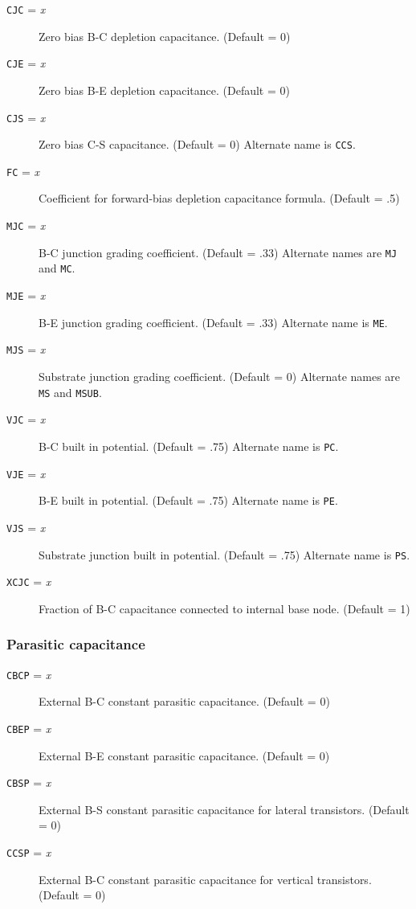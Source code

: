 \begin{description}

\item[{\tt CJC} = {\it x}]
Zero bias B-C depletion capacitance.  (Default = 0)

\item[{\tt CJE} = {\it x}]
Zero bias B-E depletion capacitance.  (Default = 0)

\item[{\tt CJS} = {\it x}]
Zero bias C-S capacitance.  (Default = 0)  Alternate name is {\tt CCS}.

\item[{\tt FC} = {\it x}]
Coefficient for forward-bias depletion capacitance formula.  (Default
= .5)

\item[{\tt MJC} = {\it x}]
B-C junction grading coefficient.  (Default = .33) Alternate names are
{\tt MJ} and {\tt MC}.

\item[{\tt MJE} = {\it x}]
B-E junction grading coefficient.  (Default = .33) Alternate name is
{\tt ME}.

\item[{\tt MJS} = {\it x}]
Substrate junction grading coefficient.  (Default = 0) Alternate names
are {\tt MS} and {\tt MSUB}.

\item[{\tt VJC} = {\it x}]
B-C built in potential.  (Default = .75)  Alternate name is {\tt PC}.

\item[{\tt VJE} = {\it x}]
B-E built in potential.  (Default = .75) Alternate name is {\tt PE}.

\item[{\tt VJS} = {\it x}]
Substrate junction built in potential.  (Default = .75)  Alternate name
is {\tt PS}.

\item[{\tt XCJC} = {\it x}]
Fraction of B-C capacitance connected to internal base node.  (Default = 1)

\end{description}

\subsubsection{Parasitic capacitance}

\begin{description}

\item[{\tt CBCP} = {\it x}]
External B-C constant parasitic capacitance.  (Default = 0)

\item[{\tt CBEP} = {\it x}]
External B-E constant parasitic capacitance.  (Default = 0)

\item[{\tt CBSP} = {\it x}]
External B-S constant parasitic capacitance for lateral transistors.
(Default = 0)

\item[{\tt CCSP} = {\it x}]
External B-C constant parasitic capacitance for vertical transistors.
(Default = 0)

\end{description}

